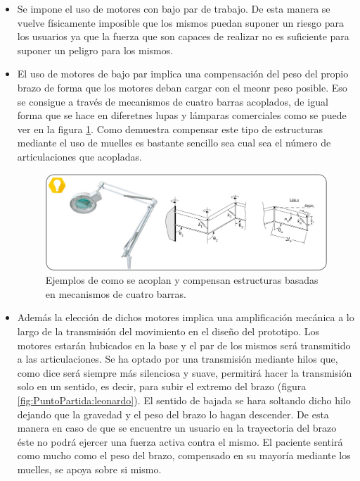 \begin{itemize}
    \item Se impone el uso de motores con bajo par de trabajo. De esta manera se vuelve físicamente imposible que los mismos puedan suponer un riesgo para los usuarios ya que la fuerza que son capaces de realizar no es suficiente para suponer un peligro para los mismos.
    \item El uso de motores de bajo par implica una compensación del peso del propio brazo de forma que los motores deban cargar con el meonr peso posible. Eso se consigue a través de mecanismos de cuatro barras acoplados, de igual forma que se hace en diferetnes lupas y lámparas comerciales como se puede ver en la figura \ref{fig:PuntoPartida:CuatroBarras}. Como demuestra \cite{Rahman_asimple} compensar este tipo de estructuras mediante el uso de muelles es bastante sencillo sea cual sea el número de articulaciones que acopladas.
    \begin{figure}
    	\centering
    	\includegraphics[width=1\textwidth]{figuras/Imagenes_PuntoPartida/CuatroBarras.jpg}
    	\caption{Ejemplos de como se acoplan y compensan estructuras basadas en mecanismos de cuatro barras.}
    	\label{fig:PuntoPartida:CuatroBarras}
    \end{figure}
    \item Además la elección de dichos motores implica una amplificación mecánica a lo largo de la transmisión del movimiento en el diseño del prototipo. Los motores estarán hubicados en la base y el par de los mismos será transmitido a las articulaciones. Se ha optado por una transmisión mediante hilos que, como dice \cite{LeonardoCodice} será siempre más silenciosa y suave, permitirá hacer la transmisión solo en un sentido, es decir, para subir el extremo del brazo (figura \ref{fig:PuntoPartida:leonardo}). El sentido de bajada se hara soltando dicho hilo dejando que la gravedad y el peso del brazo lo hagan descender. De esta manera en caso de que se encuentre un usuario en la trayectoria del brazo éste no podrá ejercer una fuerza activa contra el mismo. El paciente sentirá como mucho como el peso del brazo, compensado en su mayoría mediante los muelles, se apoya sobre si mismo.

\end{itemize}
